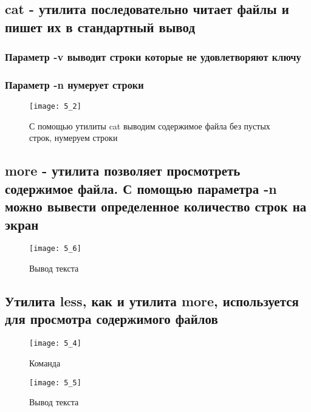 \subsection{cat - утилита последовательно читает файлы и пишет их в стандартный вывод}

\subsubsection{Параметр -v выводит строки которые не удовлетворяют ключу}
\subsubsection{Параметр -n нумерует строки}

\begin{figure}[H]
	\begin{center}
		\texttt{[image: 5\_2]}
		\caption{С помощью утилиты cat выводим содержимое файла без пустых строк, нумеруем строки} 
		\label{pic:pic_1} %
	\end{center}
\end{figure}

\subsection{more - утилита позволяет просмотреть содержимое файла. С помощью параметра -n можно вывести определенное количество строк на экран}

\begin{figure}[H]
	\begin{center}
		\texttt{[image: 5\_6]}
		\caption{Вывод текста} 
		\label{pic:pic_1} %
	\end{center}
\end{figure}

\subsection{Утилита less, как и утилита more, используется для просмотра содержимого файлов}

\begin{figure}[H]
	\begin{center}
		\texttt{[image: 5\_4]}
		\caption{Команда} 
		\label{pic:pic_1} %
	\end{center}
\end{figure}
\begin{figure}[H]
	\begin{center}
		\texttt{[image: 5\_5]}
		\caption{Вывод текста} 
		\label{pic:pic_1} %
	\end{center}
\end{figure}

